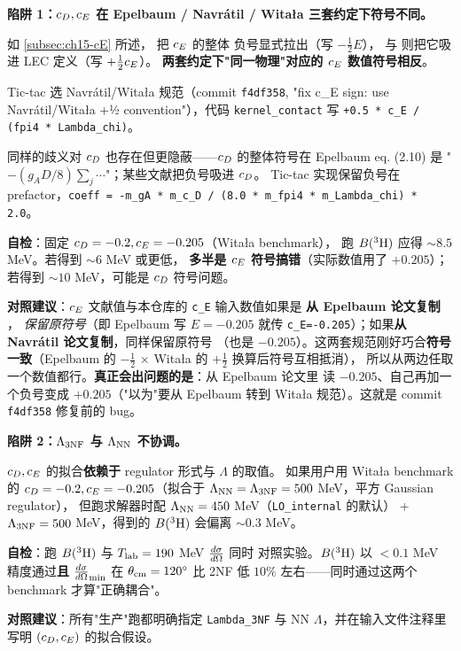 \begin{pitfallbox}[label={pit:ch15-sign-conventions}]
\label{subsec:ch15-pitfall-sign-conventions}
\textbf{陷阱 1：\(c_D, c_E\) 在 Epelbaum / Navrátil / Witała 三套约定下符号不同。}

如 \cref{subsec:ch15-cE} 所述，\cite{Epelbaum2002NLO3NF} 把 \(c_E\) 的整体
负号显式拉出（写 \(-\tfrac{1}{2} E\)），\cite{Navratil2007} 与
\cite{Witala1988} 则把它吸进 LEC 定义（写 \(+\tfrac{1}{2} c_E\)）。
\textbf{两套约定下"同一物理"对应的 \(c_E\) 数值符号相反}。

Tic-tac 选 Navrátil/Witała 规范（commit \texttt{f4df358}, "fix c\_E sign:
use Navrátil/Witała +½ convention"），代码 \texttt{kernel\_contact} 写
\texttt{+0.5 * c\_E / (fpi4 * Lambda\_chi)}。

同样的歧义对 \(c_D\) 也存在但更隐蔽——\(c_D\) 的整体符号在 Epelbaum eq.
(2.10) 是 "\(-(g_A D/8) \sum_j \cdots\)"；某些文献把负号吸进 \(c_D\)。
Tic-tac 实现保留负号在 prefactor，\texttt{coeff = -m\_gA * m\_c\_D / (8.0
* m\_fpi4 * m\_Lambda\_chi) * 2.0}。

\textbf{自检}：固定 \(c_D = -0.2, c_E = -0.205\)（Witała benchmark），
跑 \(B(^3{\rm H})\) 应得 \(\sim 8.5\) MeV。若得到 \(\sim 6\) MeV 或更低，
\textbf{多半是 \(c_E\) 符号搞错}（实际数值用了 \(+0.205\)）；若得到
\(\sim 10\) MeV，可能是 \(c_D\) 符号问题。

\textbf{对照建议}：\(c_E\) 文献值与本仓库的 \texttt{c\_E} 输入数值如果是
\textbf{从 Epelbaum 论文复制} ， \emph{保留原符号}（即 Epelbaum 写 \(E = -0.205\)
就传 \texttt{c\_E=-0.205}）；如果\textbf{从 Navrátil 论文复制}，同样保留原符号
（也是 \(-0.205\)）。这两套规范刚好巧合\textbf{符号一致}（Epelbaum 的
\(-\tfrac{1}{2}\) × Witała 的 \(+\tfrac{1}{2}\) 换算后符号互相抵消），
所以从两边任取一个数值都行。\textbf{真正会出问题的是}：从 Epelbaum 论文里
读 \(-0.205\)、自己再加一个负号变成 \(+0.205\)（"以为"要从 Epelbaum 转到
Witała 规范）。这就是 commit \texttt{f4df358} 修复前的 bug。
\end{pitfallbox}

\begin{pitfallbox}[label={pit:ch15-cutoff}]
\label{subsec:ch15-pitfall-cutoff}
\textbf{陷阱 2：\(\Lambda_{\rm 3NF}\) 与 \(\Lambda_{\rm NN}\) 不协调。}

\(c_D, c_E\) 的拟合\textbf{依赖于} regulator 形式与 \(\Lambda\) 的取值。
如果用户用 Witała benchmark 的 \(c_D = -0.2, c_E = -0.205\)（拟合于
\(\Lambda_{\rm NN} = \Lambda_{\rm 3NF} = 500\) MeV，平方 Gaussian regulator），
但跑求解器时配 \(\Lambda_{\rm NN} = 450\) MeV（\texttt{LO\_internal} 的默认）
+ \(\Lambda_{\rm 3NF} = 500\) MeV，得到的 \(B(^3{\rm H})\) 会偏离 \(\sim 0.3\)
MeV。

\textbf{自检}：跑 \(B(^3{\rm H})\) 与 \({T_{\text{lab}}} = 190\) MeV \(\frac{d\sigma}{d\Omega}\) 同时
对照实验。\(B(^3{\rm H})\) 以 \(<0.1\) MeV 精度通过\textbf{且}
\(\frac{d\sigma}{d\Omega}_{\rm min}\) 在 \(\theta_{\rm cm} = 120^\circ\) 比 2NF 低 \(10\%\)
左右——同时通过这两个 benchmark 才算"正确耦合"。

\textbf{对照建议}：所有"生产"跑都明确指定 \texttt{Lambda\_3NF} 与 NN
\(\Lambda\)，并在输入文件注释里写明 \((c_D, c_E)\) 的拟合假设。
\end{pitfallbox}


